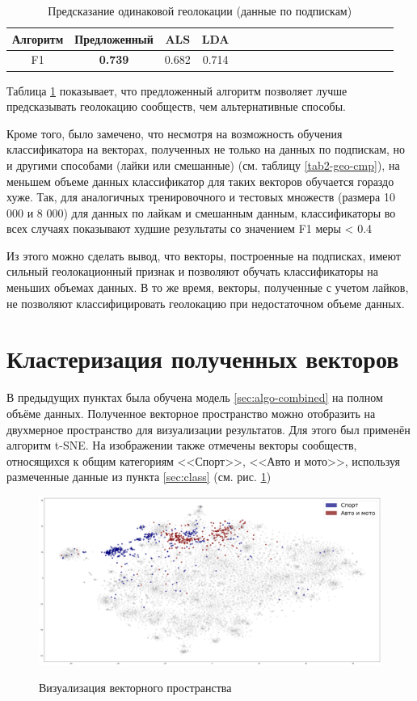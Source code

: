 \documentclass[times,specification,annotation]{itmo-student-thesis}
\begin{document}
\begin{table}[!h]
\caption{Предсказание одинаковой геолокации (данные по подпискам)} \label{tab2-geo-all}
\centering
\begin{tabular}{|*{18}{c|}}\hline
Алгоритм  & Предложенный  & ALS & LDA \\\hline
F1                        & \textbf{0.739} & 0.682  & 0.714 \\\hline
\end{tabular}
\end{table}

Таблица \ref{tab2-geo-all} показывает, что предложенный алгоритм позволяет лучше предсказывать геолокацию сообществ, чем альтернативные способы. 

Кроме того, было замечено, что несмотря на возможность обучения классификатора на векторах, полученных не только на данных по подпискам, но и другими способами (лайки или смешанные) (см. таблицу \ref{tab2-geo-cmp}), на меньшем объеме данных классификатор для таких векторов обучается гораздо хуже. Так, для аналогичных тренировочного и тестовых множеств (размера 10 000 и 8 000) для данных по лайкам и смешанным данным, классификаторы во всех случаях показывают худшие результаты со значением F1 меры < 0.4

Из этого можно сделать вывод, что векторы, построенные на подписках, имеют сильный геолокационный признак и позволяют обучать классификаторы на меньших объемах данных. В то же время, векторы, полученные с учетом лайков, не позволяют классифицировать геолокацию при недостаточном объеме данных.   

\section{Кластеризация полученных векторов}\label{sec:visual}

В предыдущих пунктах была обучена модель \ref{sec:algo-combined} на полном объёме данных. Полученное векторное пространство можно отобразить на двухмерное пространство для визуализации результатов. Для этого был применён алгоритм t-SNE. На изображении также отмечены векторы сообществ, относящихся к общим категориям <<Спорт>>, <<Авто и мото>>, используя размеченные данные из пункта \ref{sec:class} (см. рис. \ref{pic:categories})

\begin{figure}[h]
\caption{Визуализация векторного пространства}
\centering
\includegraphics[width=1\textwidth]{index0}
\label{pic:categories}
\end{figure}
\end{document}
